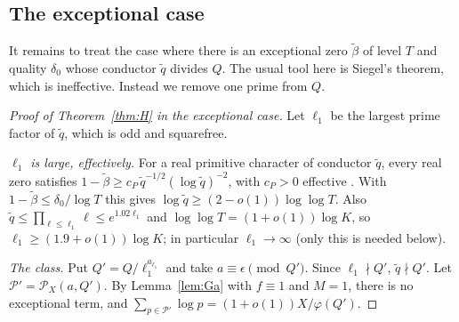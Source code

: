 \documentclass[11pt]{amsart}
\theoremstyle{remark}
\begin{document}
\subsection{The exceptional case}\label{sec:exc}

It remains to treat the case where there is an exceptional zero $\tilde\beta$ of level $T$ and quality $\delta_0$ whose conductor $\tilde q$ divides $Q$. The usual tool here is Siegel's theorem, which is ineffective. Instead we remove one prime from $Q$.



\begin{proof}[Proof of Theorem~\ref{thm:H} in the exceptional case]
Let $\ell_1$ be the largest prime factor of $\tilde q$, which is odd and squarefree.

\emph{$\ell_1$ is large, effectively.} For a real primitive character of conductor $\tilde q$, every real zero satisfies $1-\tilde\beta\ge c_P\,\tilde q^{-1/2}(\log\tilde q)^{-2}$, with $c_P>0$ effective \cite[Chapter~14]{Dav}. With $1-\tilde\beta\le\delta_0/\log T$ this gives $\log\tilde q\ge(2-o(1))\log\log T$. Also $\tilde q\le\prod_{\ell\le\ell_1}\ell\le e^{1.02\ell_1}$ and $\log\log T=(1+o(1))\log K$, so $\ell_1\ge(1.9+o(1))\log K$; in particular $\ell_1\to\infty$ (only this is needed below).

\emph{The class.} Put $Q'=Q/\ell_1^{a_{\ell_1}}$ and take $a\equiv\epsilon\pmod{Q'}$. Since $\ell_1\nmid Q'$, $\tilde q\nmid Q'$. Let $\mathcal P'=\mathcal P_X(a,Q')$. By Lemma~\ref{lem:Ga} with $f\equiv1$ and $M=1$, there is no exceptional term, and $\sum_{p\in\mathcal P'}\log p=(1+o(1))X/\varphi(Q')$.


\end{proof}
\end{document}
